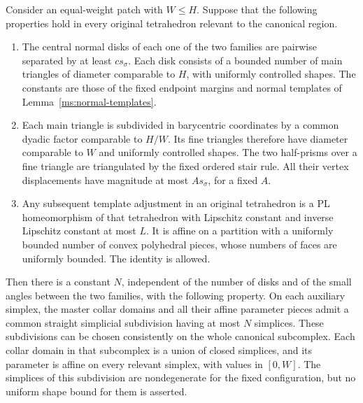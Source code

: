 \begin{lemma}
\label{ms:bounded-complexity}
Consider an equal-weight patch with $W\leq H$.  Suppose that the following
properties hold in every original tetrahedron relevant to the canonical
region.
\begin{enumerate}
\item The central normal disks of each one of the two families are
pairwise separated by at least $c s_\sigma$.  Each disk consists of a
bounded number of main triangles of diameter comparable to $H$, with
uniformly controlled shapes.  The constants are those of the fixed
endpoint margins and normal templates of
Lemma~\ref{ms:normal-templates}.
\item Each main triangle is subdivided in barycentric coordinates by a
common dyadic factor comparable to $H/W$.  Its fine triangles therefore
have diameter comparable to $W$ and uniformly controlled shapes.
The two half-prisms over a fine triangle are triangulated by the fixed
ordered stair rule.  All their vertex displacements have magnitude at
most $A s_\sigma$, for a fixed $A$.
\item Any subsequent template adjustment in an original tetrahedron is
a PL homeomorphism of that tetrahedron with Lipschitz constant and
inverse Lipschitz constant at most $L$.  It is affine on a partition
with a uniformly bounded number of convex polyhedral pieces, whose
numbers of faces are uniformly bounded.  The identity is allowed.
\end{enumerate}
Then there is a constant $N$, independent of the number of disks and
of the small angles between the two families, with the following
property.  On each auxiliary simplex, the master collar domains and
all their affine parameter pieces admit a common straight simplicial
subdivision having at most $N$ simplices.  These subdivisions can be
chosen consistently on the whole canonical subcomplex.  Each collar
domain in that subcomplex is a union of closed simplices, and its
parameter is affine on every relevant simplex, with values in $[0,W]$.
The simplices of this subdivision are nondegenerate for the fixed
configuration, but no uniform shape bound for them is asserted.
\end{lemma}


